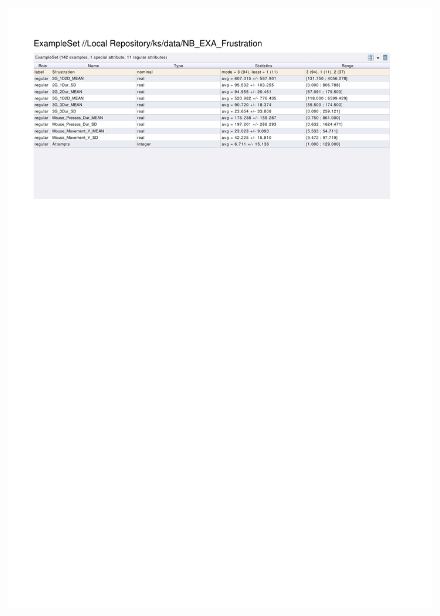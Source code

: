 \begin{figure}[htp]
  \centerline{\includegraphics[trim=0 640 0 60,clip,width=16.09cm]{results/NB_EXA_Frustration.pdf}} \caption{
} \label{NB_K_Frustration}
\end{figure}

